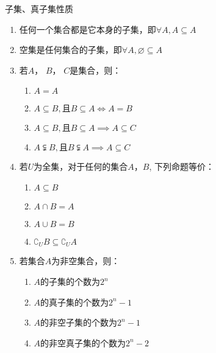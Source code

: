 \begin{property}\label{property:set-property}
子集、真子集性质
	\begin{enumerate}
		\item 任何一个集合都是它本身的子集，即$\forall A, A \subseteq A$
		\item 空集是任何集合的子集，即$\forall A, \varnothing \subseteq A$
		\item 若$A$， $B$， $C$是集合，则：
		\begin{enumerate}
			\item $A=A$
			\item $A \subseteq B, \mbox{且} B \subseteq A \iff A=B$
			\item $A \subseteq B, \mbox{且} B \subseteq A \implies A \subseteq C$
			\item $A \subsetneqq B, \mbox{且} B \subsetneqq A \implies A \subseteq C$
		\end{enumerate}
		\item 若$U$为全集，对于任何的集合$A$，$B$, 下列命题等价：
		\begin{enumerate}
			\item $A \subseteq B$
			\item $A \cap B = A$
			\item $A \cup B = B$
			\item $\complement_{U}{B} \subseteq \complement_{U}{A}$
		\end{enumerate}
		\item 若集合$A$为非空集合，则：
		\begin{enumerate}
			\item $A$的子集的个数为$2^n$
			\item $A$的真子集的个数为$2^{n}-1$
			\item $A$的非空子集的个数为$2^{n}-1$
			\item $A$的非空真子集的个数为$2^{n}-2$
		\end{enumerate}
	\end{enumerate}
\end{property}



